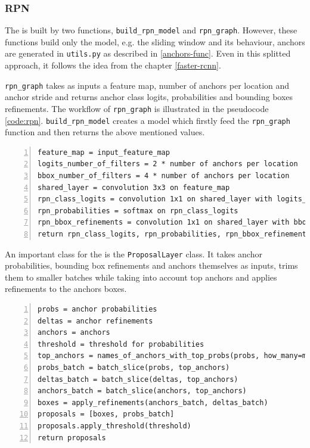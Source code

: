 \subsubsection{RPN}
\label{model-rpn}

The  is built by two functions, \verb|build_rpn_model| and \verb|rpn_graph|. However, these functions build only the model, e.g. the sliding window and its behaviour, anchors are generated in \verb|utils.py| as described in \ref{anchors-func}. Even in this splitted approach, it follows the idea from the chapter \ref{faster-rcnn}.

\verb|rpn_graph| takes as inputs a feature map, number of anchors per location and anchor stride and returns anchor class logits, probabilities and bounding boxes refinements. The workflow of \verb|rpn_graph| is illustrated in the pseudocode \ref{code:rpn}. \verb|build_rpn_model| creates a model which firstly feed the \verb|rpn_graph| function and then returns the above mentioned values.

{\scriptsize
\begin{lstlisting}[style=python, caption={rpn\_graph}, captionpos=b, label=code:rpn, deletekeywords={from, input, map},
backgroundcolor = \color{light-gray}, numbers=left, breaklines=true]
feature_map = input_feature_map
logits_number_of_filters = 2 * number of anchors per location
bbox_number_of_filters = 4 * number of anchors per location
shared_layer = convolution 3x3 on feature_map
rpn_class_logits = convolution 1x1 on shared_layer with logits_number_of_filters
rpn_probabilities = softmax on rpn_class_logits
rpn_bbox_refinements = convolution 1x1 on shared_layer with bbox_number_of_filters 
return rpn_class_logits, rpn_probabilities, rpn_bbox_refinements
\end{lstlisting}}

An important class for the  is the \verb|ProposalLayer| class. It takes anchor probabilities, bounding box refinements and anchors themselves as inputs, trims them to smaller batches while taking into account top anchors and applies refinements to the anchors boxes.

{\scriptsize
\begin{lstlisting}[style=python, caption={ProposalLayer}, captionpos=b, label=code:prop-layer, deletekeywords={from, input, map, for},
backgroundcolor = \color{light-gray}, numbers=left, breaklines=true]
probs = anchor probabilities
deltas = anchor refinements
anchors = anchors
threshold = threshold for probabilities
top_anchors = names_of_anchors_with_top_probs(probs, how_many=min(6000, len(probs)))
probs_batch = batch_slice(probs, top_anchors)
deltas_batch = batch_slice(deltas, top_anchors)
anchors_batch = batch_slice(anchors, top_anchors)
boxes = apply_refinements(anchors_batch, deltas_batch)
proposals = [boxes, probs_batch]
proposals.apply_threshold(threshold)
return proposals
\end{lstlisting}}

